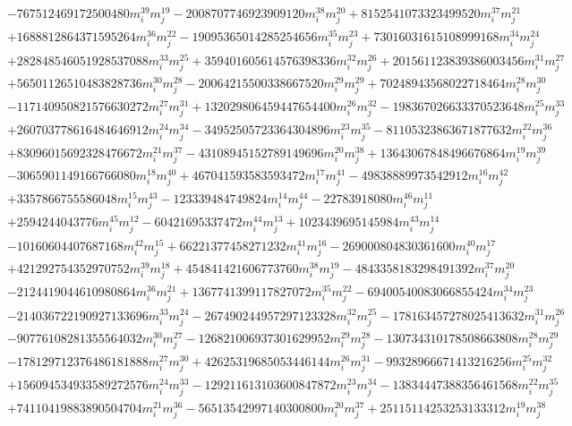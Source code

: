 {\begin{align*}
&-767512469172500480m_i^{39}m_j^{19}-2008707746923909120m_i^{38}m_j^{20}+8152541073323499520m_i^{37}m_j^{21}\\
&+1688812864371595264m_i^{36}m_j^{22}-19095365014285254656m_i^{35}m_j^{23}+73016031615108999168m_i^{34}m_j^{24}\\
&+282848546051928537088m_i^{33}m_j^{25}+359401605614576398336m_i^{32}m_j^{26}+201561123839386003456m_i^{31}m_j^{27}\\
&+56501126510483828736m_i^{30}m_j^{28}-20064215500338667520m_i^{29}m_j^{29}+70248943568022718464m_i^{28}m_j^{30}\\
&-117140950821576630272m_i^{27}m_j^{31}+132029806459447654400m_i^{26}m_j^{32}-198367026633370523648m_i^{25}m_j^{33}\\
&+260703778616484646912m_i^{24}m_j^{34}-34952505723364304896m_i^{23}m_j^{35}-81105323863671877632m_i^{22}m_j^{36}\\
&+83096015692328476672m_i^{21}m_j^{37}-43108945152789149696m_i^{20}m_j^{38}+13643067848496676864m_i^{19}m_j^{39}\\
&-3065901149166766080m_i^{18}m_j^{40}+467041593583593472m_i^{17}m_j^{41}-49838889973542912m_i^{16}m_j^{42}\\
&+3357866755586048m_i^{15}m_j^{43}-123339484749824m_i^{14}m_j^{44}-22783918080m_i^{46}m_j^{11}\\
&+2594244043776m_i^{45}m_j^{12}-60421695337472m_i^{44}m_j^{13}+1023439695145984m_i^{43}m_j^{14}\\
&-10160604407687168m_i^{42}m_j^{15}+66221377458271232m_i^{41}m_j^{16}-269000804830361600m_i^{40}m_j^{17}\\
&+421292754352970752m_i^{39}m_j^{18}+454841421606773760m_i^{38}m_j^{19}-4843358183298491392m_i^{37}m_j^{20}\\
&-2124419044610980864m_i^{36}m_j^{21}+1367741399117827072m_i^{35}m_j^{22}-69400540083066855424m_i^{34}m_j^{23}\\
&-214036722190927133696m_i^{33}m_j^{24}-267490244957297123328m_i^{32}m_j^{25}-178163457278025413632m_i^{31}m_j^{26}\\
&-90776108281355564032m_i^{30}m_j^{27}-126821006937301629952m_i^{29}m_j^{28}-130734310178508663808m_i^{28}m_j^{29}\\
&-178129712376486181888m_i^{27}m_j^{30}+42625319685053446144m_i^{26}m_j^{31}-99328966671413216256m_i^{25}m_j^{32}\\
&+156094534933589272576m_i^{24}m_j^{33}-129211613103600847872m_i^{23}m_j^{34}-13834447388356461568m_i^{22}m_j^{35}\\
&+74110419883890504704m_i^{21}m_j^{36}-56513542997140300800m_i^{20}m_j^{37}+25115114253253133312m_i^{19}m_j^{38}\\

\end{align*}}
